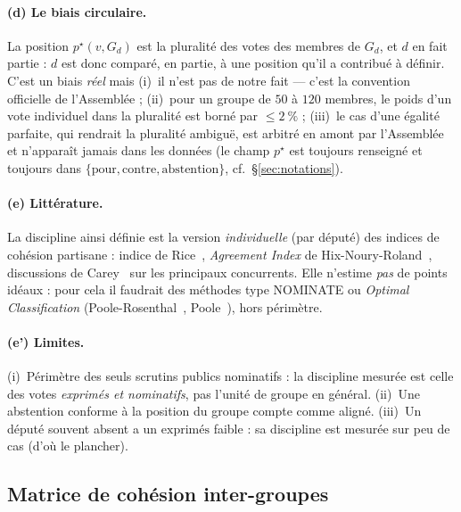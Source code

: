 \documentclass[11pt,a4paper]{article}
\begin{document}
\paragraph{(d) Le \og{}biais circulaire\fg{}.} La position $p^\star(v,G_d)$ est la
pluralité des votes des membres de $G_d$, et $d$ en fait partie : $d$ est donc
comparé, en partie, à une position qu'il a contribué à définir. C'est un biais
\emph{réel} mais (i)~il n'est pas de notre fait — c'est la convention officielle de
l'Assemblée ; (ii)~pour un groupe de $50$ à $120$ membres, le poids d'un vote
individuel dans la pluralité est borné par $\le 2~\%$ ; (iii)~le cas d'une égalité
parfaite, qui rendrait la pluralité ambiguë, est arbitré en amont par l'Assemblée
et n'apparaît jamais dans les données (le champ $p^\star$ est toujours renseigné et
toujours dans $\{\text{pour},\text{contre},\text{abstention}\}$, cf.~§\ref{sec:notations}).

\paragraph{(e) Littérature.} La discipline ainsi définie est la version
\emph{individuelle} (par député) des indices de cohésion partisane : indice de
Rice~\cite{rice1925}, \emph{Agreement Index} de Hix-Noury-Roland~\cite{hnr2005,hnr2007},
discussions de Carey~\cite{carey2007} sur les \og{}principaux concurrents\fg{}.
Elle n'estime \emph{pas} de points idéaux : pour cela il faudrait des méthodes type
NOMINATE ou \emph{Optimal Classification} (Poole-Rosenthal~\cite{pr1997}, Poole~\cite{poole2005}),
hors périmètre.

\paragraph{(e') Limites.} (i)~Périmètre des seuls scrutins publics nominatifs :
la \og{}discipline\fg{} mesurée est celle des votes \emph{exprimés et nominatifs},
pas l'unité de groupe en général. (ii)~Une abstention conforme à la position du
groupe compte comme \og{}aligné\fg{}. (iii)~Un député souvent absent a un
$\text{exprimés}$ faible : sa discipline est mesurée sur peu de cas (d'où
le plancher).

\subsection{Matrice de cohésion inter-groupes}\label{sec:matrice}
\end{document}
